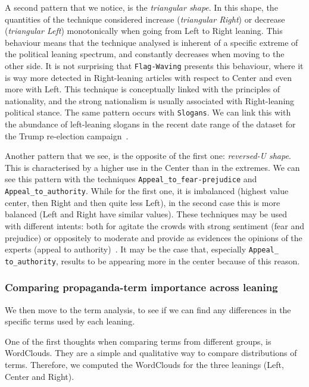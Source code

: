 A second pattern that we notice, is the \emph{triangular shape}. In this shape, the quantities of the technique considered increase (\emph{triangular Right}) or decrease (\emph{triangular Left}) monotonically when going from Left to Right leaning.
This behaviour means that the technique analysed is inherent of a specific extreme of the political leaning spectrum, and constantly decreases when moving to the other side.
It is not surprising that \texttt{Flag-Waving} presents this behaviour, where it is way more detected in Right-leaning articles with respect to Center and even more with Left. This technique is conceptually linked with the principles of nationality, and the strong nationalism is usually associated with Right-leaning political stance.
The same pattern occurs with \texttt{Slogans}. We can link this with the abundance of left-leaning slogans in the recent date range of the dataset for the Trump re-election campaign~\citep{jiang2020political}.

Another pattern that we see, is the opposite of the first one: \emph{reversed-U shape}. This is characterised by a higher use in the Center than in the extremes.
We can see this pattern with the techniques \texttt{Appeal\_to\_fear-prejudice} and \texttt{Appeal\_to\_authority}. While for the first one, it is imbalanced (highest value center, then Right and then quite less Left), in the second case this is more balanced (Left and Right have similar values).
These techniques may be used with different intents: both for agitate the crowds with strong sentiment (fear and prejudice) or oppositely to moderate and provide as evidences the opinions of the experts (appeal to authority)~\citep{walton2010appeal}. It may be the case that, especially \texttt{Appeal\_ to\_authority}, results to be appearing more in the center because of this reason.

\subsubsection{Comparing propaganda-term importance across leaning}
We then move to the term analysis, to see if we can find any differences in the specific terms used by each leaning.

One of the first thoughts when comparing terms from different groups, is WordClouds.
They are a simple and qualitative way to compare distributions of terms.
Therefore, we computed the WordClouds for the three leanings (Left, Center and Right).



